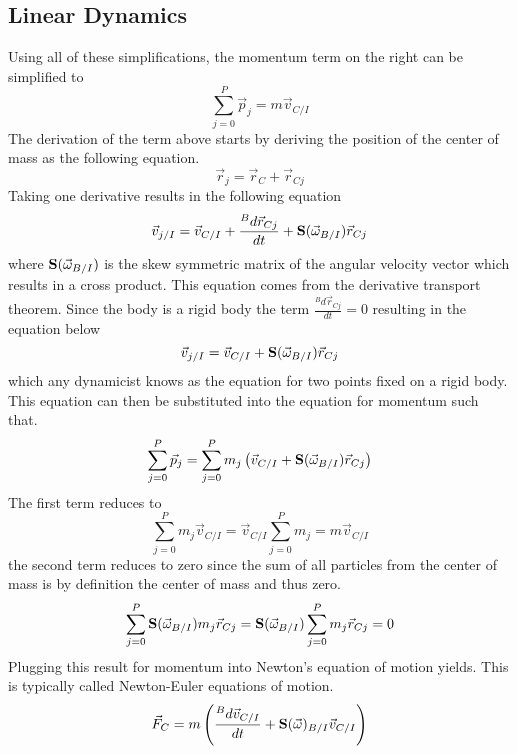 \documentclass{article}
\begin{document}
\subsection{Linear Dynamics}
Using all of these simplifications, the momentum term on the right can
be simplified to 
\begin{equation}
\sum\limits_{j=0}^P \vec{p}_j = m \vec{v}_{C/I}
\end{equation}
The derivation of the term above starts by deriving the position of
the center of mass as the following equation.
\begin{equation}
\vec{r}_{j} = \vec{r}_C + \vec{r}_{Cj}
\end{equation}
Taking one derivative results in the following equation
\begin{equation}
\vec{v}_{j/I} = \vec{v}_{C/I} + \frac{{}^Bd \vec{r}_{Cj}}{dt} +
{\bf S}(\vec{\omega}_{B/I}) \vec{r}_{Cj}
\end{equation}
where ${\bf S}(\vec{\omega}_{B/I})$ is the skew symmetric matrix of the
angular velocity vector which results in a cross product. This
equation comes from the derivative transport theorem. Since the body
is a rigid body the term $\frac{{}^Bd \vec{r}_{Cj}}{dt}=0$ resulting
in the equation below
\begin{equation}
\vec{v}_{j/I} = \vec{v}_{C/I} + {\bf S}(\vec{\omega}_{B/I}) \vec{r}_{Cj}
\end{equation}
which any dynamicist knows as the equation for two points fixed on a
rigid body. This equation can then be substituted into the equation
for momentum such that.
\begin{equation}
\sum\limits_{j=0}^P \vec{p}_j =  \sum\limits_{j=0}^P m_j \left(\vec{v}_{C/I}
+ {\bf S}(\vec{\omega}_{B/I}) \vec{r}_{Cj}\right)
\end{equation}
The first term reduces to 
\begin{equation}
\sum\limits_{j=0}^P m_j \vec{v}_{C/I} =  \vec{v}_{C/I}
\sum\limits_{j=0}^P m_j =  m \vec{v}_{C/I} 
\end{equation}
the second term reduces to zero since the sum of all particles from
the center of mass is by definition the center of mass and thus zero.
\begin{equation}
\sum\limits_{j=0}^P {\bf S}(\vec{\omega}_{B/I}) m_j\vec{r}_{Cj} =
{\bf S}(\vec{\omega}_{B/I})\sum\limits_{j=0}^P m_j\vec{r}_{Cj} = 0
\end{equation}
Plugging this result for momentum into Newton's equation of motion
yields. This is typically called Newton-Euler equations of motion.
\begin{equation}
\vec{F}_C = m \left(\frac{{}^Bd \vec{v}_{C/I}}{dt} +
{\bf S}(\vec{\omega})_{B/I} \vec{v}_{C/I} \right)
\end{equation}
\end{document}
